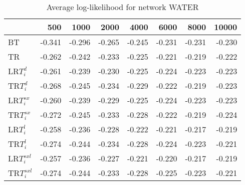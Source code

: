 \begin{table}
 \begin{center}
 \begin{tabular}{lrrrrrrr}
 & 500 & 1000 & 2000 & 4000 & 6000 & 8000 & 10000\\\hline
BT & -0.341 & -0.296 & -0.265 & -0.245 & -0.231 & -0.231 & -0.230\\\hline
TR & -0.262 & -0.242 & -0.233 & -0.225 & -0.221 & -0.219 & -0.222\\\hline
LR$T_i^d$ & -0.261 & -0.239 & -0.230 & -0.225 & -0.224 & -0.223 & -0.223\\\hline
TR$T_i^d$ & -0.268 & -0.245 & -0.234 & -0.229 & -0.222 & -0.219 & -0.223\\\hline
LR$T_i^{sx}$ & -0.260 & -0.239 & -0.229 & -0.225 & -0.224 & -0.223 & -0.223\\\hline
TR$T_i^{sx}$ & -0.272 & -0.245 & -0.233 & -0.228 & -0.222 & -0.219 & -0.224\\\hline
LR$T_i^l$ & -0.258 & -0.236 & -0.228 & -0.222 & -0.221 & -0.217 & -0.219\\\hline
TR$T_i^l$ & -0.274 & -0.244 & -0.234 & -0.228 & -0.224 & -0.223 & -0.221\\\hline
LR$T_i^{sxl}$ & -0.257 & -0.236 & -0.227 & -0.221 & -0.220 & -0.217 & -0.219\\\hline
TR$T_i^{sxl}$ & -0.274 & -0.244 & -0.233 & -0.228 & -0.225 & -0.223 & -0.221\\\hline
\end{tabular}
\end{center}
\caption{Average log-likelihood for network WATER }
\label{Waterll}
\end{table}


